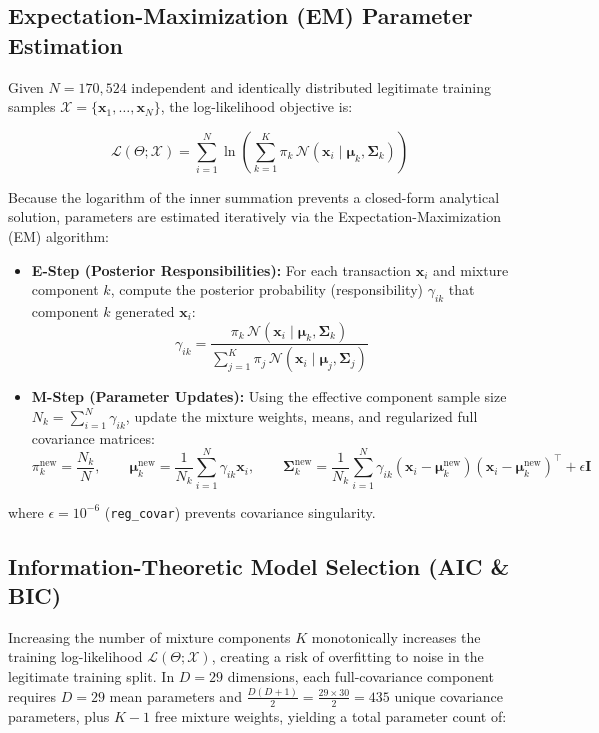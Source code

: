 \documentclass[11pt, a4paper]{article}
\begin{document}
\subsection{Expectation-Maximization (EM) Parameter Estimation}
Given $N = 170,524$ independent and identically distributed legitimate training samples $\mathcal{X} = \{\mathbf{x}_1, \dots, \mathbf{x}_N\}$, the log-likelihood objective is:

\begin{equation}
\mathcal{L}(\Theta; \mathcal{X}) = \sum_{i=1}^{N} \ln \left( \sum_{k=1}^{K} \pi_k \, \mathcal{N}(\mathbf{x}_i \mid \boldsymbol{\mu}_k, \boldsymbol{\Sigma}_k) \right)
\end{equation}

Because the logarithm of the inner summation prevents a closed-form analytical solution, parameters are estimated iteratively via the Expectation-Maximization (EM) algorithm:
\begin{itemize}
    \item \textbf{E-Step (Posterior Responsibilities):} For each transaction $\mathbf{x}_i$ and mixture component $k$, compute the posterior probability (responsibility) $\gamma_{ik}$ that component $k$ generated $\mathbf{x}_i$:
    \begin{equation}
    \gamma_{ik} = \frac{\pi_k \, \mathcal{N}(\mathbf{x}_i \mid \boldsymbol{\mu}_k, \boldsymbol{\Sigma}_k)}{\sum_{j=1}^{K} \pi_j \, \mathcal{N}(\mathbf{x}_i \mid \boldsymbol{\mu}_j, \boldsymbol{\Sigma}_j)}
    \end{equation}
    \item \textbf{M-Step (Parameter Updates):} Using the effective component sample size $N_k = \sum_{i=1}^{N} \gamma_{ik}$, update the mixture weights, means, and regularized full covariance matrices:
    \begin{equation}
    \pi_k^{\text{new}} = \frac{N_k}{N}, \qquad \boldsymbol{\mu}_k^{\text{new}} = \frac{1}{N_k} \sum_{i=1}^{N} \gamma_{ik} \mathbf{x}_i, \qquad \boldsymbol{\Sigma}_k^{\text{new}} = \frac{1}{N_k} \sum_{i=1}^{N} \gamma_{ik} (\mathbf{x}_i - \boldsymbol{\mu}_k^{\text{new}})(\mathbf{x}_i - \boldsymbol{\mu}_k^{\text{new}})^{\top} + \epsilon \mathbf{I}
    \end{equation}
\end{itemize}
where $\epsilon = 10^{-6}$ (\texttt{reg\_covar}) prevents covariance singularity.

\subsection{Information-Theoretic Model Selection (AIC \& BIC)}
Increasing the number of mixture components $K$ monotonically increases the training log-likelihood $\mathcal{L}(\Theta; \mathcal{X})$, creating a risk of overfitting to noise in the legitimate training split. In $D = 29$ dimensions, each full-covariance component requires $D = 29$ mean parameters and $\frac{D(D+1)}{2} = \frac{29 \times 30}{2} = 435$ unique covariance parameters, plus $K - 1$ free mixture weights, yielding a total parameter count of:
\end{document}
